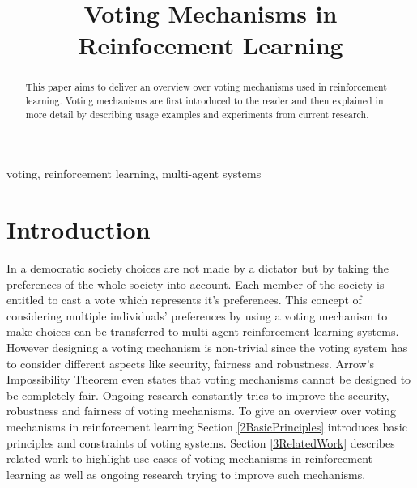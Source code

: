 \documentclass[conference]{IEEEtran}
\begin{document}
\title{Voting Mechanisms in Reinfocement Learning}

\author{
}

\maketitle

\begin{abstract}
This paper aims to deliver an overview over voting mechanisms used in reinforcement learning.
Voting mechanisms are first introduced to the reader and then explained in more detail by
describing usage examples and experiments from current research. 
\end{abstract}

\begin{IEEEkeywords}
voting, reinforcement learning, multi-agent systems
\end{IEEEkeywords}

\section{Introduction}
In a democratic society choices are not made by a dictator but by taking the preferences of the whole society into account. Each member of the society is entitled to cast a vote which represents it's preferences.
This concept of considering multiple individuals' preferences by using a voting mechanism to make choices can be transferred to multi-agent reinforcement learning systems.
\newline
However designing a voting mechanism is non-trivial since the voting system has to consider different aspects like security, fairness and robustness.
Arrow's Impossibility Theorem even states that voting mechanisms cannot be designed to be completely fair.
Ongoing research constantly tries to improve the security, robustness and fairness of voting mechanisms.
\newline
To give an overview over voting mechanisms in reinforcement learning Section \ref{2BasicPrinciples} introduces basic principles and constraints of voting systems.
Section \ref{3RelatedWork} describes related work to highlight use cases of voting mechanisms in reinforcement learning as well as ongoing research trying to improve such mechanisms.
\end{document}
